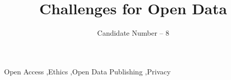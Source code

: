 \documentclass[12pt]{elsarticle}
\begin{document}
\begin{frontmatter}



\title{Challenges for Open Data
}


\author{Candidate Number -- 8}

% 

\begin{keyword}
Open Access \sep Ethics \sep Open Data Publishing \sep Privacy


\end{keyword}
\end{frontmatter}
\end{document}
